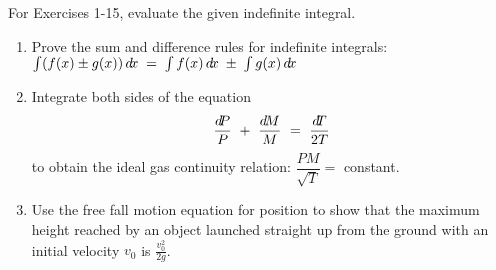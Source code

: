 \divider
\vspace{3mm}
\startexercises\label{sec5dot1}
{\small
{}
\par\noindent For Exercises 1-15, evaluate the given indefinite integral.
\begin{enumerate}[\bfseries 1.]
 \item Prove the sum and difference rules for indefinite integrals: 
  $\int (f(x) \pm g(x))\,d\!x \;=\; \int f(x)\,d\!x \;\pm\; \int g(x)\,d\!x$
 \item Integrate both sides of the equation
\[
\frac{d\negmedspace P}{P} ~+~ \frac{d\!M}{M} ~=~ \frac{d\negmedspace T}{2T}
\]
to obtain the ideal gas continuity relation: $\dfrac{PM}{\sqrt{T}} = $ constant.
 \item\label{exer:projmax0} Use the free fall motion equation for position to
  show that the maximum height reached by an object launched straight up from
  the ground with an initial velocity $v_0$ is $\frac{v_0^2}{2g}$.
\end{enumerate}
}
\newpage
